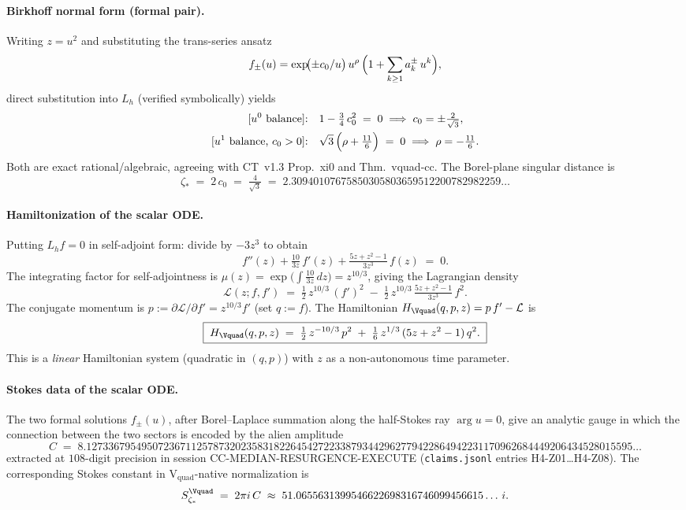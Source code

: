 \paragraph{Birkhoff normal form (formal pair).}
Writing $z = u^2$ and substituting the trans-series ansatz
\[
  f_{\pm}(u) = \exp\!\bigl(\pm c_0 / u\bigr)\,u^{\rho}\,
  \Bigl(1 + \sum_{k\ge 1} a_k^{\pm}\,u^k\Bigr),
\]
direct substitution into $L_h$ (verified symbolically) yields
\[
  \begin{aligned}
    \text{[$u^0$ balance]:}\quad
      &1 - \tfrac{3}{4}\,c_0^2 \;=\; 0
        \;\Longrightarrow\;
        c_0 = \pm \tfrac{2}{\sqrt{3}}, \\
    \text{[$u^1$ balance, $c_0>0$]:}\quad
      &\sqrt{3}\,\Bigl(\rho + \tfrac{11}{6}\Bigr) \;=\; 0
        \;\Longrightarrow\;
        \rho = -\tfrac{11}{6}.
  \end{aligned}
\]
Both are exact rational/algebraic, agreeing with CT~v1.3
\textsf{Prop.~xi0} and \textsf{Thm.~vquad-cc}.
The Borel-plane singular distance is
\[
  \boxed{\;
    \zeta_* \;=\; 2\,c_0 \;=\; \tfrac{4}{\sqrt 3}
            \;=\; 2.30940107675850305803659512200782982259\ldots
  \;}
\]

\paragraph{Hamiltonization of the scalar ODE.}
Putting $L_h f = 0$ in self-adjoint form: divide by $-3 z^3$
to obtain
\[
  f''(z) + \tfrac{10}{3 z}\,f'(z)
        + \tfrac{5z + z^2 - 1}{3 z^3}\,f(z) \;=\; 0.
\]
The integrating factor for self-adjointness is
$\mu(z) = \exp\!\bigl(\int \tfrac{10}{3 z} \,dz\bigr)
       = z^{10/3}$,
giving the Lagrangian density
\[
  \mathcal{L}(z; f, f')
  \;=\; \tfrac{1}{2}\,z^{10/3}\,(f')^2
       \;-\; \tfrac{1}{2}\,z^{10/3}\,
              \tfrac{5z + z^2 - 1}{3 z^3}\,f^2.
\]
The conjugate momentum is $p := \partial \mathcal{L}/\partial f' = z^{10/3} f'$
(set $q := f$). The Hamiltonian
$H_{\Vquad}(q,p,z) = p\,f' - \mathcal{L}$ is
\[
  \boxed{\;
    H_{\Vquad}(q,p,z)
    \;=\; \tfrac{1}{2}\, z^{-10/3}\, p^2
        \;+\; \tfrac{1}{6}\, z^{1/3}\,(5z + z^2 - 1)\,q^2.
  \;}
\]
This is a \emph{linear} Hamiltonian system (quadratic in
$(q,p)$) with $z$ as a non-autonomous time parameter.

\paragraph{Stokes data of the scalar ODE.}
The two formal solutions $f_{\pm}(u)$, after Borel--Laplace
summation along the half-Stokes ray $\arg u = 0$, give an
analytic gauge in which the connection between the two
sectors is encoded by the alien amplitude
\[
  C \;=\; 8.12733679549507236711257873202358318226454272233879
       3442962779422864942231170962684449206434528015595\ldots
\]
extracted at $108$-digit precision in
session \textsf{CC-MEDIAN-RESURGENCE-EXECUTE}
(\texttt{claims.jsonl} entries \textsf{H4-Z01}\ldots\textsf{H4-Z08}).
The corresponding Stokes constant in V$_\mathrm{quad}$-native
normalization is
\[
  S_{\zeta_*}^{\Vquad} \;=\; 2\pi i\,C
  \;\approx\; 51.0655631399546622698316746099456615\ldots\,i.
\]

